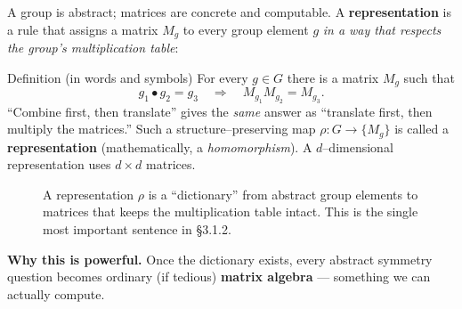 \documentclass[11pt]{article}
\begin{document}
A group is abstract; matrices are concrete and computable. A
\textbf{representation} is a rule that assigns a matrix $M_g$ to every group
element $g$ \emph{in a way that respects the group's multiplication table}:

\begin{keybox}{Definition (in words and symbols)}
For every $g\in G$ there is a matrix $M_g$ such that
\[
g_1\bullet g_2 = g_3 \quad\Longrightarrow\quad M_{g_1} M_{g_2} = M_{g_3}.
\]
``Combine first, then translate'' gives the \emph{same} answer as ``translate
first, then multiply the matrices.'' Such a structure--preserving map
$\rho: G \to \{M_g\}$ is called a \textbf{representation} (mathematically, a
\emph{homomorphism}). A $d$--dimensional representation uses $d\times d$
matrices.
\end{keybox}

\begin{figure}[H]
\centering
{}
\caption{A representation $\rho$ is a ``dictionary'' from abstract group
elements to matrices that keeps the multiplication table intact. This is the
single most important sentence in \S3.1.2.}
\end{figure}

\noindent\textbf{Why this is powerful.} Once the dictionary exists, every
abstract symmetry question becomes ordinary (if tedious) \textbf{matrix
algebra} --- something we can actually compute.
\end{document}
